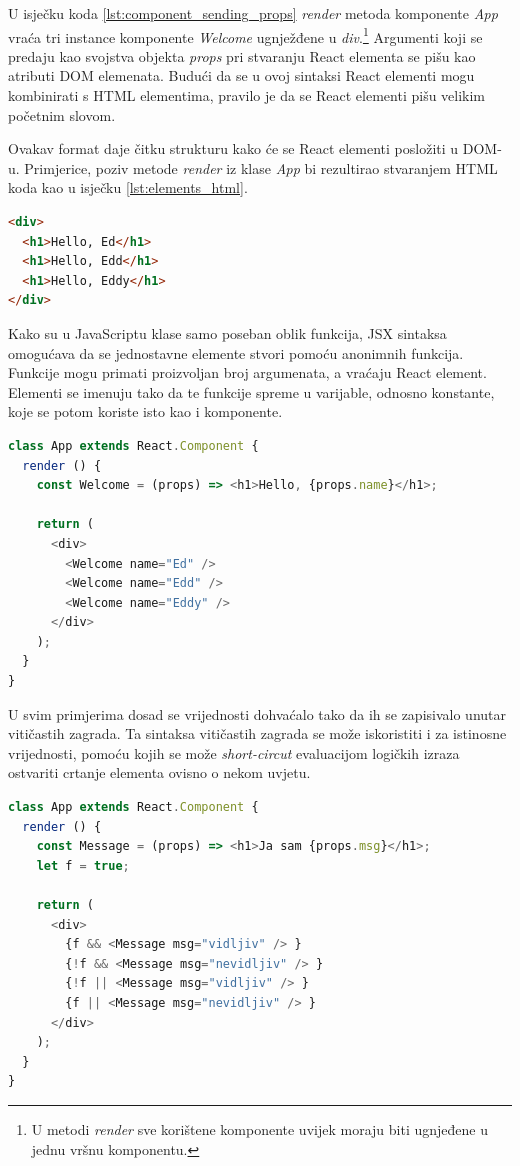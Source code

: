 \documentclass[times, utf8, zavrsni, numeric]{fer}
\newcommand{\razmakp}{\vspace{18pt}}
\newcommand{\razmaks}{\vspace{10pt}}
\begin{document}
\razmakp

U isječku koda \ref{lst:component_sending_props} \emph{render} metoda komponente \emph{App} vraća tri instance komponente \emph{Welcome} ugnježđene u \emph{div}.\footnote{U metodi \emph{render} sve korištene komponente uvijek moraju biti ugnjeđene u jednu vršnu komponentu.}
Argumenti koji se predaju kao svojstva objekta \emph{props} pri stvaranju React elementa se pišu kao atributi DOM elemenata.
Budući da se u ovoj sintaksi React elementi mogu kombinirati s HTML elementima, pravilo je da se React elementi pišu velikim početnim slovom\citep{reactDocsJSX}.

Ovakav format daje čitku strukturu kako će se React elementi posložiti u DOM-u.
Primjerice, poziv metode \emph{render} iz klase \emph{App} bi rezultirao stvaranjem HTML koda kao u isječku \ref{lst:elements_html}.

\razmakp
\begin{lstlisting}[language=html, caption={Elementi isječka koda \ref{lst:component_sending_props} prikazani kao renderirani DOM elementi}, label={lst:elements_html}]
<div>
  <h1>Hello, Ed</h1>
  <h1>Hello, Edd</h1>
  <h1>Hello, Eddy</h1>
</div>
\end{lstlisting}
\razmaks

Kako su u JavaScriptu klase samo poseban oblik funkcija, JSX sintaksa omogućava da se jednostavne elemente stvori pomoću anonimnih funkcija.
Funkcije mogu primati proizvoljan broj argumenata, a vraćaju React element.
Elementi se imenuju tako da te funkcije spreme u varijable, odnosno konstante, koje se potom koriste isto kao i komponente.

\razmakp
\begin{lstlisting}[language=JavaScript, caption={Korištenje anonimne funkcije za stvaranje elementa}]
class App extends React.Component {
  render () {
    const Welcome = (props) => <h1>Hello, {props.name}</h1>;
    
    return (
      <div>
        <Welcome name="Ed" />
        <Welcome name="Edd" />
        <Welcome name="Eddy" />
      </div>
    );
  }
}
\end{lstlisting}
\razmaks

U svim primjerima dosad se vrijednosti dohvaćalo tako da ih se zapisivalo unutar vitičastih zagrada.
Ta sintaksa vitičastih zagrada se može iskoristiti i za istinosne vrijednosti, pomoću kojih se može \emph{short-circut} evaluacijom logičkih izraza ostvariti crtanje elementa ovisno o nekom uvjetu.

\razmakp
\begin{lstlisting}[language=JavaScript, caption={Uvjetno crtanje elementa}]
class App extends React.Component {
  render () {
    const Message = (props) => <h1>Ja sam {props.msg}</h1>;
    let f = true;
    
    return (
      <div>
        {f && <Message msg="vidljiv" /> }
        {!f && <Message msg="nevidljiv" /> }
        {!f || <Message msg="vidljiv" /> }
        {f || <Message msg="nevidljiv" /> }
      </div>
    );
  }
}
\end{lstlisting}
\razmaks
\end{document}
